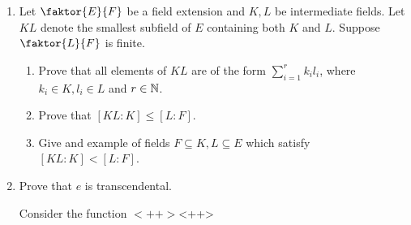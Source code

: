 \documentclass[answers]{exam}
\newcommand{\quotient}[2]{\faktor{#1}{#2}}
\begin{document}
\begin{enumerate}
\begin{enumerate}
\begin{solution}
\end{solution}
\end{enumerate}

\item Let $\quotient{E}{F}$ be a field extension and $K,L$ be intermediate
fields. Let $KL$ denote the smallest subfield of $E$ containing both $K$ and
$L$. Suppose $\quotient{L}{F}$ is finite.
\begin{enumerate}
\item  Prove that all elements of $KL$ are of the form
$\displaystyle\sum\limits^r_{i=1} k_il_i$, where $k_i \in K, l_i \in L$ and $r
\in \mathbb{N}$.
\begin{solution}

\end{solution}

\item Prove that $[KL:K] \leq [L:F]$.
\begin{solution}

\end{solution}

\item Give and example of fields $F \subseteq K, L \subseteq E$ which satisfy
$[KL:K] < [L:F]$.
\begin{solution}

\end{solution}
\end{enumerate}

\item Prove that $e$ is transcendental.
\begin{solution}
Consider the function $<++>$<++>
\end{solution}
\end{enumerate}
\end{document}
